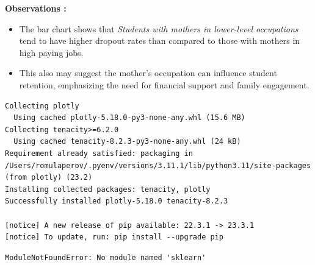 \documentclass[
  letterpaper,
  DIV=11,
  numbers=noendperiod]{scrartcl}
\begin{document}
\textbf{Observations :}

\begin{itemize}
\item
  The bar chart shows that \emph{Students with mothers in lower-level
  occupations} tend to have higher dropout rates than compared to those
  with mothers in high paying jobs.
\item
  This also may suggest the mother's occupation can influence student
  retention, emphasizing the need for financial support and family
  engagement.
\end{itemize}

\begin{verbatim}
Collecting plotly
  Using cached plotly-5.18.0-py3-none-any.whl (15.6 MB)
Collecting tenacity>=6.2.0
  Using cached tenacity-8.2.3-py3-none-any.whl (24 kB)
Requirement already satisfied: packaging in /Users/romulaperov/.pyenv/versions/3.11.1/lib/python3.11/site-packages (from plotly) (23.2)
Installing collected packages: tenacity, plotly
Successfully installed plotly-5.18.0 tenacity-8.2.3

[notice] A new release of pip available: 22.3.1 -> 23.3.1
[notice] To update, run: pip install --upgrade pip
\end{verbatim}

\begin{verbatim}
ModuleNotFoundError: No module named 'sklearn'
\end{verbatim}
\end{document}
